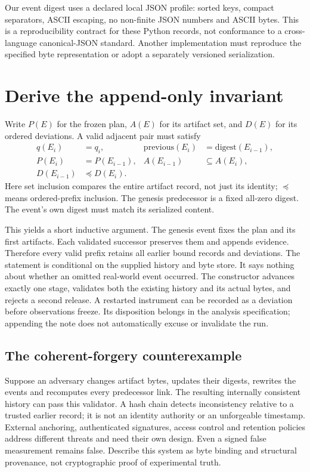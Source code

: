 Our event digest uses a declared local JSON profile: sorted keys, compact separators,
ASCII escaping, no non-finite JSON numbers and ASCII bytes. This is a reproducibility
contract for these Python records, not conformance to a cross-language canonical-JSON
standard. Another implementation must reproduce the specified byte representation
or adopt a separately versioned serialization.

\section{Derive the append-only invariant}
Write $P(E)$ for the frozen plan, $A(E)$ for its artifact set, and $D(E)$ for its
ordered deviations. A valid adjacent pair must satisfy
\[
\begin{aligned}
q(E_i)&=q_i,&
\mathrm{previous}(E_i)&=\mathrm{digest}(E_{i-1}),\\
P(E_i)&=P(E_{i-1}),&
A(E_{i-1})&\subseteq A(E_i),\\
D(E_{i-1})&\preceq D(E_i).
\end{aligned}
\]
Here set inclusion compares the entire artifact record, not just its identity;
$\preceq$ means ordered-prefix inclusion. The genesis predecessor is a fixed
all-zero digest. The event's own digest must match its serialized content.

This yields a short inductive argument. The genesis event fixes the plan and its
first artifacts. Each validated successor preserves them and appends evidence.
Therefore every valid prefix retains all earlier bound records and deviations.
The statement is conditional on the supplied history and byte store. It says
nothing about whether an omitted real-world event occurred.
The constructor advances exactly one stage, validates both the existing history
and its actual bytes, and rejects a second release. A restarted instrument can
be recorded as a deviation before observations freeze. Its disposition belongs
in the analysis specification; appending the note does not automatically excuse
or invalidate the run.

\subsection{The coherent-forgery counterexample}
Suppose an adversary changes artifact bytes, updates their digests, rewrites the
events and recomputes every predecessor link. The resulting internally consistent
history can pass this validator. A hash chain detects inconsistency relative to
a trusted earlier record; it is not an identity authority or an unforgeable timestamp.
External anchoring, authenticated signatures, access control and retention policies
address different threats and need their own design. Even a signed false measurement
remains false. Describe this system as byte binding and structural provenance,
not cryptographic proof of experimental truth.

